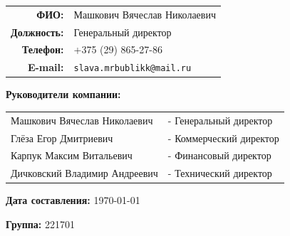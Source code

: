 \begin{titlepage}
\begin{tabular}{rl}
    \textbf{ФИО:} & Машкович Вячеслав Николаевич \\
    \textbf{Должность:} & Генеральный директор \\
    \textbf{Телефон:} & +375 (29) 865-27-86 \\
    \textbf{E-mail:} & \texttt{slava.mrbublikk@mail.ru} \\ %
\end{tabular}
\vspace{0.4cm}

{\Large \textbf{Руководители компании:} \par}
\vspace{0.2cm}

\begin{tabular}{ll}
    Машкович Вячеслав Николаевич & - Генеральный директор \\
    Глёза Егор Дмитриевич & - Коммерческий директор \\
    Карпук Максим Витальевич & - Финансовый директор \\
    Дичковский Владимир Андреевич & - Технический директор \\
\end{tabular}
\vspace{1.5cm}

{\large \textbf{Дата составления:} \today \par}
{\large \textbf{Группа:} 221701 \par}


\vfill
\end{titlepage}